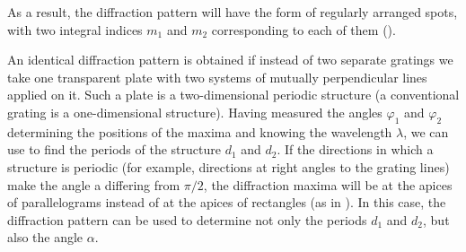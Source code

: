 \noindent
As a result, the diffraction pattern will have the form of regularly arranged spots, with two integral indices $m_1$ and $m_2$ corresponding to each of them ().

An identical diffraction pattern is obtained if instead of two separate gratings we take one transparent plate with two systems of mutually perpendicular lines applied on it.
Such a plate is a two-dimensional periodic structure (a conventional grating is a one-dimensional structure).
Having measured the angles $\varphi_1$ and $\varphi_2$  determining the positions of the maxima and knowing the wavelength $\lambda$, we can use  to find the periods of the structure $d_1$ and $d_2$.
If the directions in which a structure is periodic (for example, directions at right angles to the grating lines) make the angle a differing from $\pi/2$, the diffraction maxima will be at the apices of parallelograms instead of at the apices of rectangles (as in ).
In this case, the diffraction pattern can be used
to determine not only the periods $d_1$ and $d_2$, but also the angle $\alpha$.

